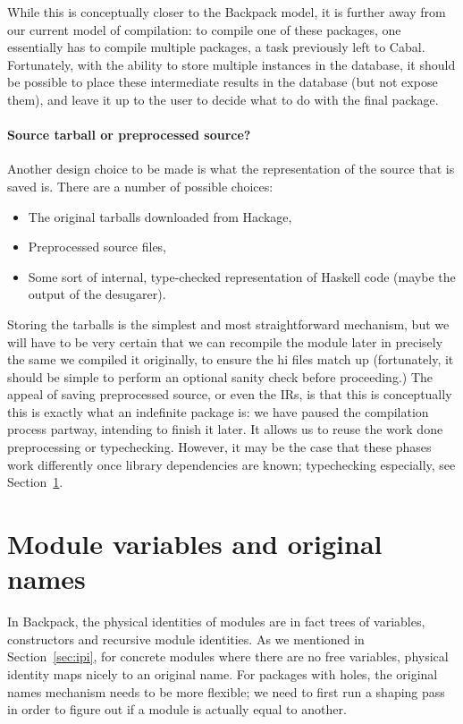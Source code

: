 \documentclass{article}
\begin{document}
While this is conceptually closer to the Backpack model, it is further
away from our current model of compilation: to compile one of these packages,
one essentially has to compile multiple packages, a task previously left
to Cabal.  Fortunately, with the ability to store multiple instances in the database,
it should be possible to place these intermediate results in the database (but
not expose them), and leave it up to the user to decide what to do with the
final package.

\paragraph{Source tarball or preprocessed source?}  Another design choice
to be made is what the representation of the source that is saved is.  There
are a number of possible choices:

\begin{itemize}
    \item The original tarballs downloaded from Hackage,
    \item Preprocessed source files,
    \item Some sort of internal, type-checked representation of Haskell code (maybe the output of the desugarer).
\end{itemize}

Storing the tarballs is the simplest and most straightforward mechanism,
but we will have to be very certain that we can recompile the module
later in precisely the same we compiled it originally, to ensure the hi
files match up (fortunately, it should be simple to perform an optional
sanity check before proceeding.) The appeal of saving preprocessed
source, or even the IRs, is that this is conceptually this is exactly
what an indefinite package is: we have paused the compilation process
partway, intending to finish it later. It allows us to reuse the work
done preprocessing or typechecking.  However, it may be the case that
these phases work differently once library dependencies are known; typechecking
especially, see Section~\ref{sec:variables}.

\section{Module variables and original names}\label{sec:variables}

In Backpack, the physical identities of modules are in fact trees of
variables, constructors and recursive module identities.  As we
mentioned in Section~\ref{sec:ipi}, for concrete modules where there are
no free variables, physical identity maps nicely to an original name.
For packages with holes, the original names mechanism needs to be more
flexible; we need to first run a shaping pass in order to figure out if
a module is actually equal to another.
\end{document}

